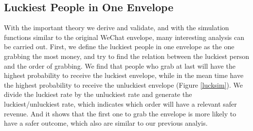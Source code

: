 \documentclass{scrartcl}
\begin{document}
\subsection{Luckiest People in One Envelope}\label{sec5.1}
With the important theory we derive and validate, and with the simulation functions similar to the original WeChat envelope, many interesting analysis can be carried out.
First, we define the luckiest people in one envelope as the one grabbing the most money, and try to find the relation between the luckiest person and the order of grabbing. We find that people who grab at last will have the highest probability to receive the luckiest envelope, while in the mean time have the highest probability to receive the unluckiest envelope (Figure \ref{lucksim}). We divide the luckiest rate by the unluckiest rate and generate the luckiest/unluckiest rate, which indicates which order will have a relevant safer revenue. And it shows that the first one to grab the envelope is more likely to have a safer outcome, which also are similar to our previous analyis.\par
\end{document}
